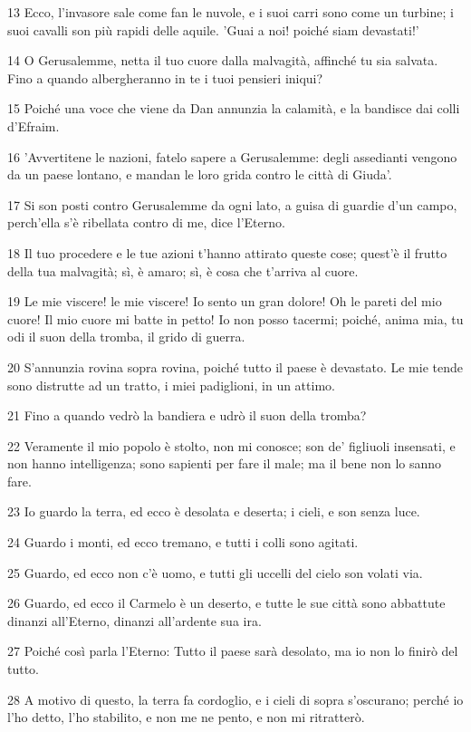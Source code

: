 \par 13 Ecco, l'invasore sale come fan le nuvole, e i suoi carri sono come un turbine; i suoi cavalli son più rapidi delle aquile. 'Guai a noi! poiché siam devastati!'
\par 14 O Gerusalemme, netta il tuo cuore dalla malvagità, affinché tu sia salvata. Fino a quando albergheranno in te i tuoi pensieri iniqui?
\par 15 Poiché una voce che viene da Dan annunzia la calamità, e la bandisce dai colli d'Efraim.
\par 16 'Avvertitene le nazioni, fatelo sapere a Gerusalemme: degli assedianti vengono da un paese lontano, e mandan le loro grida contro le città di Giuda'.
\par 17 Si son posti contro Gerusalemme da ogni lato, a guisa di guardie d'un campo, perch'ella s'è ribellata contro di me, dice l'Eterno.
\par 18 Il tuo procedere e le tue azioni t'hanno attirato queste cose; quest'è il frutto della tua malvagità; sì, è amaro; sì, è cosa che t'arriva al cuore.
\par 19 Le mie viscere! le mie viscere! Io sento un gran dolore! Oh le pareti del mio cuore! Il mio cuore mi batte in petto! Io non posso tacermi; poiché, anima mia, tu odi il suon della tromba, il grido di guerra.
\par 20 S'annunzia rovina sopra rovina, poiché tutto il paese è devastato. Le mie tende sono distrutte ad un tratto, i miei padiglioni, in un attimo.
\par 21 Fino a quando vedrò la bandiera e udrò il suon della tromba?
\par 22 Veramente il mio popolo è stolto, non mi conosce; son de' figliuoli insensati, e non hanno intelligenza; sono sapienti per fare il male; ma il bene non lo sanno fare.
\par 23 Io guardo la terra, ed ecco è desolata e deserta; i cieli, e son senza luce.
\par 24 Guardo i monti, ed ecco tremano, e tutti i colli sono agitati.
\par 25 Guardo, ed ecco non c'è uomo, e tutti gli uccelli del cielo son volati via.
\par 26 Guardo, ed ecco il Carmelo è un deserto, e tutte le sue città sono abbattute dinanzi all'Eterno, dinanzi all'ardente sua ira.
\par 27 Poiché così parla l'Eterno: Tutto il paese sarà desolato, ma io non lo finirò del tutto.
\par 28 A motivo di questo, la terra fa cordoglio, e i cieli di sopra s'oscurano; perché io l'ho detto, l'ho stabilito, e non me ne pento, e non mi ritratterò.
